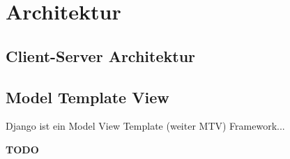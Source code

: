 \chapter{Architektur}
    
    \section{Client-Server Architektur}
    
    \section{Model Template View}
    Django ist ein Model View Template (weiter MTV) Framework...
    
    \textbf{TODO}

    